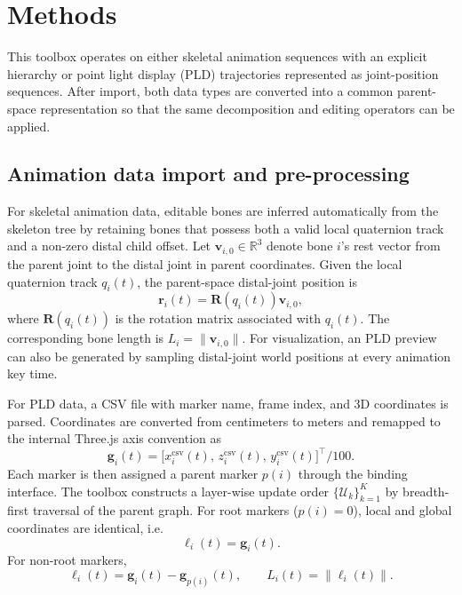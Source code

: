 \section{Methods}\label{sec:methods}
This toolbox operates on either skeletal animation sequences with an explicit hierarchy or point light display (PLD) trajectories represented as joint-position sequences. After import, both data types are converted into a common parent-space representation so that the same decomposition and editing operators can be applied.

\subsection{Animation data import and pre-processing}\label{subsec:methods-import}
For skeletal animation data, editable bones are inferred automatically from the skeleton tree by retaining bones that possess both a valid local quaternion track and a non-zero distal child offset. Let $\mathbf{v}_{i,0}\in\mathbb{R}^3$ denote bone $i$'s rest vector from the parent joint to the distal joint in parent coordinates. Given the local quaternion track $q_i(t)$, the parent-space distal-joint position is
\begin{equation}
\mathbf{r}_i(t)=\mathbf{R}\!\left(q_i(t)\right)\mathbf{v}_{i,0},
\end{equation}
where $\mathbf{R}(q_i(t))$ is the rotation matrix associated with $q_i(t)$. The corresponding bone length is $L_i=\|\mathbf{v}_{i,0}\|$. For visualization, an PLD preview can also be generated by sampling distal-joint world positions at every animation key time.

For PLD data, a CSV file with marker name, frame index, and 3D coordinates is parsed. Coordinates are converted from centimeters to meters and remapped to the internal Three.js axis convention as
\begin{equation}
\mathbf{g}_i(t)=\bigl[x_i^{\mathrm{csv}}(t),\,z_i^{\mathrm{csv}}(t),\,y_i^{\mathrm{csv}}(t)\bigr]^\top /100.
\end{equation}
Each marker is then assigned a parent marker $p(i)$ through the binding interface. The toolbox constructs a layer-wise update order $\{\mathcal{U}_k\}_{k=1}^{K}$ by breadth-first traversal of the parent graph. For root markers ($p(i)=0$), local and global coordinates are identical, i.e.
\begin{equation}
\boldsymbol{\ell}_i(t)=\mathbf{g}_i(t).
\end{equation}
For non-root markers,
\begin{equation}
\boldsymbol{\ell}_i(t)=\mathbf{g}_i(t)-\mathbf{g}_{p(i)}(t), \qquad
L_i(t)=\|\boldsymbol{\ell}_i(t)\|.
\end{equation}

